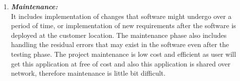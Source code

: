 \begin{enumerate}
\item \textbf{\emph{Maintenance:}}\\
It includes implementation of changes that software might undergo over a period of time, or implementation of new requirements after the software is deployed at the customer location. The maintenance phase also includes handling the residual errors that may exist in the software even after the testing phase. The project maintenance is low cost and efficient as user will get this application at free of cost and also this application is shared over network, therefore maintenance is little bit difficult. 

\end{enumerate}
